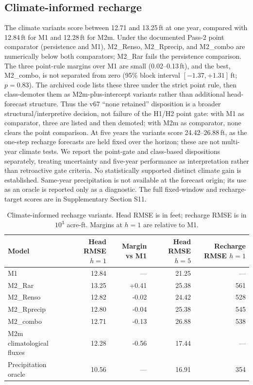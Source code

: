\documentclass[11pt]{article}
\begin{document}
\subsection{Climate-informed recharge}

The climate variants score between 12.71 and 13.25\,ft at one year, compared with 12.84\,ft for M1 and 12.28\,ft for M2m. Under the documented Pass-2 point comparator (persistence and M1), M2\_Renso, M2\_Rprecip, and M2\_combo are numerically below both comparators; M2\_Rar fails the persistence comparison. The three point-rule margins over M1 are small (0.02--0.13\,ft), and the best, M2\_combo, is not separated from zero (95\% block interval \([-1.37,+1.31]\)\,ft; \(p=0.83\)). The archived code lists these three under the strict point rule, then class-demotes them as M2m-plus-intercept variants rather than additional head-forecast structure. Thus the v67 ``none retained'' disposition is a broader structural/interpretive decision, not failure of the H1/H2 point gate: with M1 as comparator, three are listed and then demoted; with M2m as comparator, none clears the point comparison. At five years the variants score 24.42--26.88\,ft, as the one-step recharge forecasts are held fixed over the horizon; these are not multi-year climate tests. We report the point-gate and class-based dispositions separately, treating uncertainty and five-year performance as interpretation rather than retroactive gate criteria. No statistically supported distinct climate gain is established. Same-year precipitation is not available at the forecast origin; its use as an oracle is reported only as a diagnostic. The full fixed-window and recharge-target scores are in Supplementary Section S11.

\begin{table}[htbp]
\centering\small
\caption{Climate-informed recharge variants. Head RMSE is in feet; recharge RMSE is in \(10^3\) acre-ft. Margins at \(h=1\) are relative to M1.}
\label{tab:climate}
\begin{tabular}{@{}lrrrr@{}}
\toprule
Model & Head RMSE \(h=1\) & Margin vs M1 & Head RMSE \(h=5\) & Recharge RMSE \(h=1\) \\
\midrule
M1 & 12.84 & --- & 21.25 & --- \\
M2\_Rar & 13.25 & +0.41 & 25.38 & 561 \\
M2\_Renso & 12.82 & -0.02 & 24.42 & 528 \\
M2\_Rprecip & 12.80 & -0.04 & 25.38 & 545 \\
M2\_combo & 12.71 & -0.13 & 26.88 & 538 \\
M2m climatological fluxes & 12.28 & -0.56 & 17.44 & --- \\
Precipitation oracle & 10.56 & --- & 16.91 & 354 \\
\bottomrule
\end{tabular}
\end{table}
\end{document}

